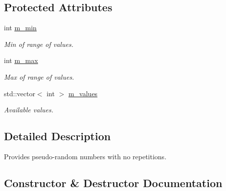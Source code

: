 \subsection*{Protected Attributes}
\begin{DoxyCompactItemize}
\item 
\mbox{\label{classDUtils_1_1Random_1_1UnrepeatedRandomizer_a7b59cc2afb7d7db20aa048ea95365134}} 
int \hyperlink{classDUtils_1_1Random_1_1UnrepeatedRandomizer_a7b59cc2afb7d7db20aa048ea95365134}{m\+\_\+min}
\begin{DoxyCompactList}\small\item\em Min of range of values. \end{DoxyCompactList}\item 
\mbox{\label{classDUtils_1_1Random_1_1UnrepeatedRandomizer_a5c2d23ba34589d23ac131e37feac6f6b}} 
int \hyperlink{classDUtils_1_1Random_1_1UnrepeatedRandomizer_a5c2d23ba34589d23ac131e37feac6f6b}{m\+\_\+max}
\begin{DoxyCompactList}\small\item\em Max of range of values. \end{DoxyCompactList}\item 
\mbox{\label{classDUtils_1_1Random_1_1UnrepeatedRandomizer_adbe23146bfc61994e361d356282ce6c4}} 
std\+::vector$<$ int $>$ \hyperlink{classDUtils_1_1Random_1_1UnrepeatedRandomizer_adbe23146bfc61994e361d356282ce6c4}{m\+\_\+values}
\begin{DoxyCompactList}\small\item\em Available values. \end{DoxyCompactList}\end{DoxyCompactItemize}


\subsection{Detailed Description}
Provides pseudo-\/random numbers with no repetitions. 

\subsection{Constructor \& Destructor Documentation}
\mbox{\label{classDUtils_1_1Random_1_1UnrepeatedRandomizer_ae073cba77da776dae607f22fd289b220}} 
